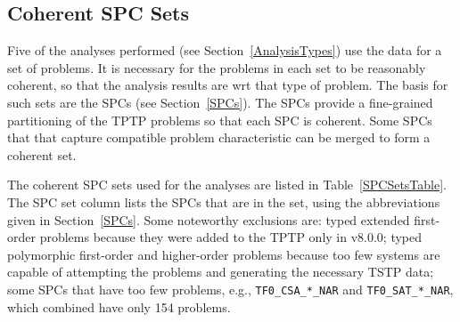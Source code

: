 \documentclass[runningheads]{llncs}
\begin{document}
\subsection{Coherent SPC Sets}
\label{SPCSets}

Five of the analyses performed (see Section~\ref{AnalysisTypes}) use the data for a set of 
problems.
It is necessary for the problems in each set to be 
reasonably coherent, so that the analysis results are wrt that type of problem.
The basis for such sets are the SPCs (see Section~\ref{SPCs}).
The SPCs provide a fine-grained partitioning of the TPTP problems so that each SPC is coherent.
Some SPCs that that capture compatible problem characteristic can be merged to form a coherent set.

The coherent SPC sets used for the analyses are listed in Table~\ref{SPCSetsTable}.
The SPC set column lists the SPCs that are in the set, using the abbreviations given in 
Section~\ref{SPCs}.
Some noteworthy exclusions are:
typed extended first-order problems because they were added to the TPTP only in v8.0.0;
typed polymorphic first-order and higher-order problems because too few systems are 
capable of attempting the problems and generating the necessary TSTP data;
some SPCs that have too few problems, e.g., {\tt TF0\_CSA\_*\_NAR} and {\tt TF0\_SAT\_*\_NAR},
which combined have only 154 problems.
\end{document}
